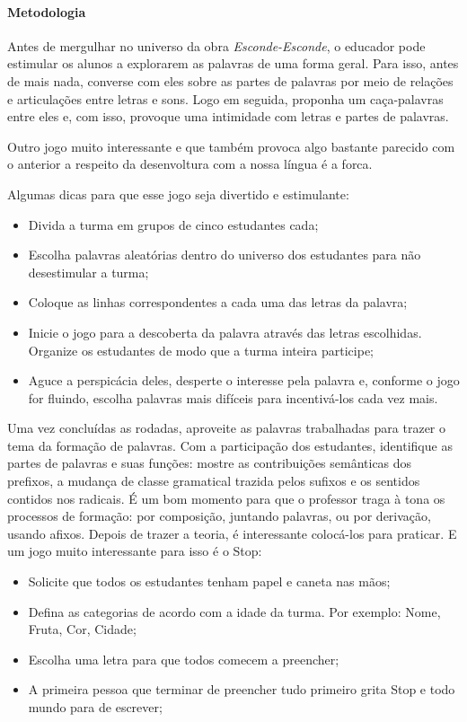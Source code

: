 \documentclass[11pt]{extarticle}
\begin{document}
\paragraph{Metodologia} Antes de mergulhar no universo da obra \textit{Esconde-Esconde}, o educador pode estimular os alunos a explorarem as palavras de uma forma geral. Para isso, antes de mais nada, converse com eles sobre as partes de palavras por meio de relações e articulações entre letras e sons. Logo em seguida, proponha um caça-palavras entre eles e, com isso, provoque uma intimidade com letras e partes de palavras. 

Outro jogo muito interessante e que também provoca algo bastante parecido com o anterior a respeito da desenvoltura com a nossa língua é a forca. 

Algumas dicas para que esse jogo seja divertido e estimulante: 


\begin{itemize}
\item Divida a turma em grupos de cinco estudantes cada;
\item Escolha palavras aleatórias dentro do universo dos estudantes para não desestimular a turma;
\item Coloque as linhas correspondentes a cada uma das letras da palavra; 
\item Inicie o jogo para a descoberta da palavra através das letras escolhidas. Organize os estudantes de modo que a turma inteira participe;
\item Aguce a perspicácia deles, desperte o interesse pela palavra e, conforme o jogo for fluindo, escolha palavras mais difíceis para incentivá-los cada vez mais.

\end{itemize}

Uma vez concluídas as rodadas, aproveite as palavras trabalhadas para trazer o tema da formação de palavras. Com a participação dos estudantes, identifique as partes de palavras e suas funções: mostre as contribuições semânticas dos prefixos, a mudança de classe gramatical trazida pelos sufixos e os sentidos contidos nos radicais. É um bom momento para que o professor traga à tona os processos de formação: por composição, juntando palavras, ou por derivação, usando afixos. Depois de trazer a teoria, é interessante colocá-los para praticar. E um jogo muito interessante para isso é o Stop:

\begin{itemize}
\item Solicite que todos os estudantes tenham papel e caneta nas mãos;
\item Defina as categorias de acordo com a idade da turma. Por exemplo: Nome, Fruta, Cor, Cidade;
\item Escolha uma letra para que todos comecem a preencher;
\item A primeira pessoa que terminar de preencher tudo primeiro grita Stop e todo mundo para de escrever;
\end{itemize}
\end{document}
